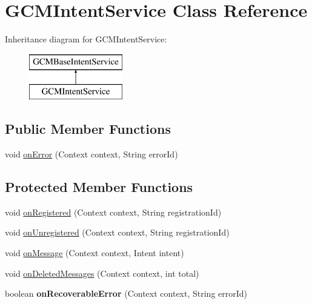 \hypertarget{classcom_1_1example_1_1android_1_1apis_1_1_g_c_m_intent_service}{\section{G\-C\-M\-Intent\-Service Class Reference}
\label{classcom_1_1example_1_1android_1_1apis_1_1_g_c_m_intent_service}
}
Inheritance diagram for G\-C\-M\-Intent\-Service\-:\begin{figure}[H]
\begin{center}
\leavevmode
\includegraphics[height=2.000000cm]{classcom_1_1example_1_1android_1_1apis_1_1_g_c_m_intent_service}
\end{center}
\end{figure}
\subsection*{Public Member Functions}
\begin{DoxyCompactItemize}
\item 
void \hyperlink{classcom_1_1example_1_1android_1_1apis_1_1_g_c_m_intent_service_ae37637d7c0d211ad2eabedbe9fd1868d}{on\-Error} (Context context, String error\-Id)
\end{DoxyCompactItemize}
\subsection*{Protected Member Functions}
\begin{DoxyCompactItemize}
\item 
void \hyperlink{classcom_1_1example_1_1android_1_1apis_1_1_g_c_m_intent_service_a728b0ab7da9ddde56987bd076805cd82}{on\-Registered} (Context context, String registration\-Id)
\item 
void \hyperlink{classcom_1_1example_1_1android_1_1apis_1_1_g_c_m_intent_service_a1895cf62d624c24fbc1ff2eaeef76064}{on\-Unregistered} (Context context, String registration\-Id)
\item 
void \hyperlink{classcom_1_1example_1_1android_1_1apis_1_1_g_c_m_intent_service_a0e3f670228c7669e83881949ce01a5b1}{on\-Message} (Context context, Intent intent)
\item 
void \hyperlink{classcom_1_1example_1_1android_1_1apis_1_1_g_c_m_intent_service_a5a09fc23e1e041a0cdd718ef858e971d}{on\-Deleted\-Messages} (Context context, int total)
\item 
\hypertarget{classcom_1_1example_1_1android_1_1apis_1_1_g_c_m_intent_service_afb513b7107b20cc9a40bcb9b31a9ecca}{boolean {\bfseries on\-Recoverable\-Error} (Context context, String error\-Id)}\label{classcom_1_1example_1_1android_1_1apis_1_1_g_c_m_intent_service_afb513b7107b20cc9a40bcb9b31a9ecca}

\end{DoxyCompactItemize}


